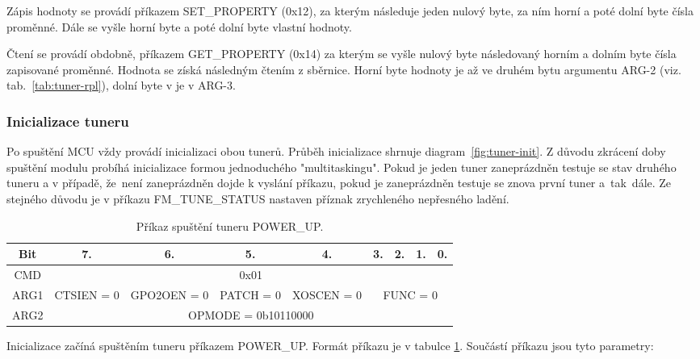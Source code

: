 Zápis hodnoty se provádí příkazem SET\_PROPERTY (0x12), za kterým následuje jeden nulový byte, za ním horní a poté dolní byte čísla proměnné. Dále se vyšle horní byte a poté dolní byte vlastní hodnoty. 

Čtení se provádí obdobně, příkazem GET\_PROPERTY (0x14) za kterým se vyšle nulový byte následovaný horním a dolním byte čísla zapisované proměnné. Hodnota se získá následným čtením z \iic sběrnice. Horní byte hodnoty je až ve druhém bytu argumentu ARG-2 (viz. tab.~\ref{tab:tuner-rpl}), dolní byte v je v ARG-3.


\subsubsection{Inicializace tuneru}
\label{subsubsec:tun-init}

Po spuštění MCU vždy provádí inicializaci obou tunerů. Průběh inicializace shrnuje diagram~\ref{fig:tuner-init}. Z důvodu zkrácení doby spuštění modulu probíhá inicializace formou jednoduchého "multitaskingu". Pokud je jeden tuner zaneprázdněn testuje se stav druhého tuneru a v případě, že~není zaneprázdněn dojde k vyslání příkazu, pokud je zaneprázdněn testuje se znova první  tuner a~tak~dále. Ze stejného důvodu je v příkazu FM\_TUNE\_STATUS nastaven příznak zrychleného nepřesného ladění.


\begin{table}[ht!]
\begin{center}
\begin{tabular}{|c|c|c|c|c|c|c|c|c|}
\hline 
Bit & 7. & 6. & 5. & 4. & 3. & 2. & 1. & 0. \\ 
\hline 
CMD & \multicolumn{8}{c|}{0x01} \\ 
\hline 
ARG1 & CTSIEN = 0 & GPO2OEN = 0 & PATCH = 0 & XOSCEN = 0 & \multicolumn{4}{c|}{FUNC = 0} \\ 
\hline 
ARG2 & \multicolumn{8}{c|}{OPMODE = 0b10110000} \\ 
\hline 
\end{tabular} 
\end{center}
\caption{Příkaz spuštění tuneru POWER\_UP.}
\label{tab:tuner-power-up} 
\end{table}

Inicializace začíná spuštěním tuneru příkazem POWER\_UP. Formát příkazu je v tabulce \ref{tab:tuner-power-up}. Součástí příkazu jsou tyto parametry:

